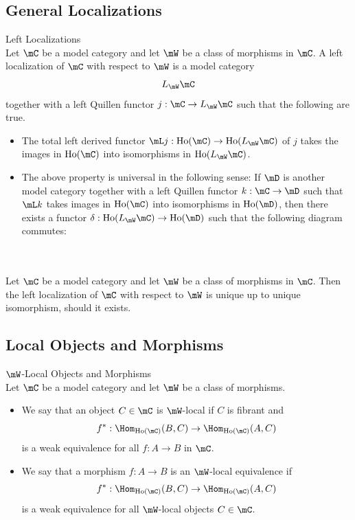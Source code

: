 \documentclass[a4paper]{article}
\begin{document}
\subsection{General Localizations}
\begin{defn}{Left Localizations}{}\\ Let $\mC$ be a model category and let $\mW$ be a class of morphisms in $\mC$. A left localization of $\mC$ with respect to $\mW$ is a model category $$L_\mW\mC$$ together with a left Quillen functor $j:\mC\to L_\mW\mC$ such that the following are true. 
\begin{itemize}
\item The total left derived functor $\mL j:\text{Ho}(\mC)\to\text{Ho}(L_\mW\mC)$ of $j$ takes the images in $\text{Ho}(\mC)$ into isomorphisms in $\text{Ho}(L_\mW\mC)$. 
\item The above property is universal in the following sense: If $\mD$ is another model category together with a left Quillen functor $k:\mC\to\mD$ such that $\mL k$ takes images in $\text{Ho}(\mC)$ into isomorphisms in $\text{Ho}(\mD)$, then there exists a functor $\delta:\text{Ho}(L_\mW\mC)\to\text{Ho}(\mD)$ such that the following diagram commutes: \\
\\
\end{itemize}
\end{defn}

\begin{prp}{}{}\\ Let $\mC$ be a model category and let $\mW$ be a class of morphisms in $\mC$. Then the left localization of $\mC$ with respect to $\mW$ is unique up to unique isomorphism, should it exists. 
\end{prp}

\subsection{Local Objects and Morphisms}
\begin{defn}{$\mW$-Local Objects and Morphisms}{}\\ Let $\mC$ be a model category and let $\mW$ be a class of morphisms. 
\begin{itemize}
\item We say that an object $C\in\mC$ is $\mW$-local if $C$ is fibrant and $$f^\ast:\Hom_{\text{Ho}(\mC)}(B,C)\to\Hom_{\text{Ho}(\mC)}(A,C)$$ is a weak equivalence for all $f:A\to B$ in $\mC$. 
\item We say that a morphism $f:A\to B$ is an $\mW$-local equivalence if $$f^\ast:\Hom_{\text{Ho}(\mC)}(B,C)\to\Hom_{\text{Ho}(\mC)}(A,C)$$ is a weak equivalence for all $\mW$-local objects $C\in\mC$. 
\end{itemize}
\end{defn}
\end{document}
